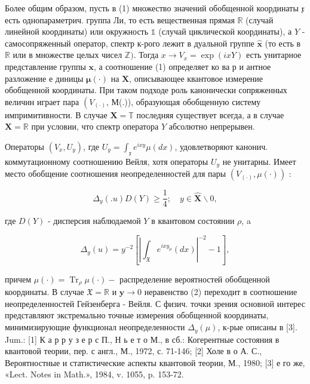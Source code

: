 \documentclass[10pt]{article}
\begin{document}
Более общим образом, пусть в (1) множество значений обобщенной координаты $\mathfrak{x}$ есть однопараметрич. группа Ли, то есть вещественная прямая $\mathbb{R}$ (случай линейной координаты) или окружность $\mathbb{1}$ (случай циклической координаты), а $Y$ - самосопряженный оператор, спектр к-рого лежит в дуальной группе $\hat{\boldsymbol{x}}$ (то есть в $\mathbb{R}$ или в множестве целых чисел $\mathbb{Z})$. Тогда $x \rightarrow V_{x}=\exp (i x Y)$ есть унитарное представление группы $\boldsymbol{x}$, а соотношение (1) определяет ко ва р и антное разложение е диницы $\boldsymbol{\mu}(\cdot)$ на $\boldsymbol{X}$, описывающее квантовое измерение обобщенной координаты. При таком подходе роль канонически сопряженных величин играет пара $\left(V_{(\cdot)}\right.$, М(.)), образующая обобщенную систему импримитивности. В случае $\boldsymbol{X}=\mathbb{T}$ последняя существует всегда, а в случае $\boldsymbol{X}=\mathbb{R}$ при условии, что спектр оператора $Y$ абсолютно непрерывен.



Операторы $\left(V_{x}, U_{y}\right)$, где $U_{y}=\int_{\mathfrak{x}} e^{i x y} \mathscr{\mu}(d x)$, удовлетворяют канонич. коммутационному соотношению Вейля, хотя операторы $U_{y}$ не унитарны. Имеет место обобщение соотношения неопределенностей для пары $\left(V_{(\cdot)}, \mathscr{\mu}(\cdot)\right)$ :



\[

\Delta_{y}(. u) D(Y) \geqslant \frac{1}{4} ; \quad y \in \hat{\boldsymbol{X}} \backslash 0,

\]



где $D(Y)$ - дисперсия наблюдаемой $Y$ в квантовом состоянии $\rho$, a



\[

\Delta_{y}(u)=y^{-2}\left[\left|\int_{\mathfrak{X}} e^{i x y_{\mu}}(d x)\right|^{-2}-1\right],

\]



причем $\mu(\cdot)=\operatorname{Tr}_{\rho} \mu(\cdot)-$ распределение вероятностей обобщенной координаты. В случае $\mathfrak{X}=\mathbb{R}$ и $\boldsymbol{y} \rightarrow 0$ неравенство (2) переходит в соотношение неопределенностей Гейзенберга - Вейля. С физич. точки зрения основной интерес представляют экстремально точные измерения обобщенной координаты, минимизирующие функционал неопределенности $\Delta_{y}(\mathscr{\mu})$, к-рые описаны в [3]. Jum.: [1] К а р р у з е р с П., Н ь е т о М., в сб.: Когерентные состояния в квантовой теории, пер. с англ., М., 1972, с. 71-146; [2] Холе в о А. С., Вероятностные и статистические аспекты квантовой теории, М., 1980; [3] е го же, «Lect. Notes in Math.», 1984, v. 1055, p. 153-72.
\end{document}
